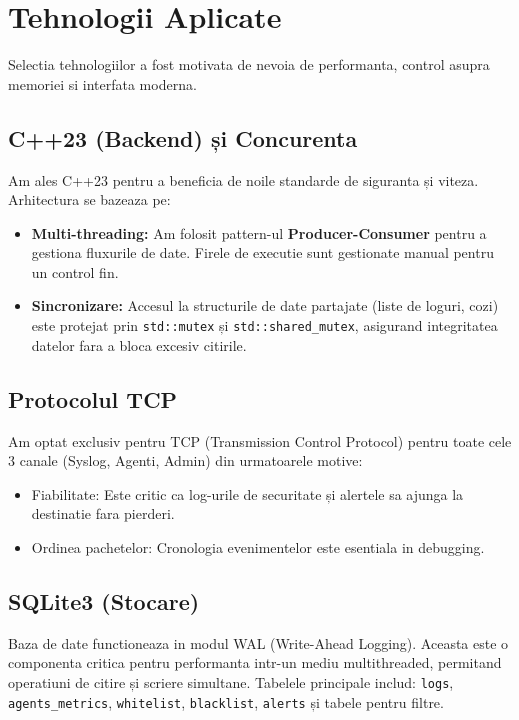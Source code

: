 \documentclass[runningheads]{llncs}
\begin{document}
\section{Tehnologii Aplicate}

Selectia tehnologiilor a fost motivata de nevoia de performanta, control asupra memoriei si interfata moderna.

\subsection{C++23 (Backend) și Concurenta}
Am ales C++23 pentru a beneficia de noile standarde de siguranta și viteza. Arhitectura se bazeaza pe:
\begin{itemize}
    \item \textbf{Multi-threading:} Am folosit pattern-ul \textbf{Producer-Consumer} pentru a gestiona fluxurile de date. Firele de executie sunt gestionate manual pentru un control fin.
    \item \textbf{Sincronizare:} Accesul la structurile de date partajate (liste de loguri, cozi) este protejat prin \texttt{std::mutex} și \texttt{std::shared\_mutex}, asigurand integritatea datelor fara a bloca excesiv citirile.
\end{itemize}

\subsection{Protocolul TCP}
Am optat exclusiv pentru TCP (Transmission Control Protocol) pentru toate cele 3 canale (Syslog, Agenti, Admin) din urmatoarele motive:
\begin{itemize}
    \item Fiabilitate: Este critic ca log-urile de securitate și alertele sa ajunga la destinatie fara pierderi.
    \item Ordinea pachetelor: Cronologia evenimentelor este esentiala in debugging.
\end{itemize}

\subsection{SQLite3 (Stocare)}
Baza de date functioneaza in modul WAL (Write-Ahead Logging). Aceasta este o componenta critica pentru performanta intr-un mediu multithreaded, permitand operatiuni de citire și scriere simultane. Tabelele principale includ: \texttt{logs}, \texttt{agents\_metrics}, \texttt{whitelist}, \texttt{blacklist}, \texttt{alerts} și tabele pentru filtre.
\end{document}
